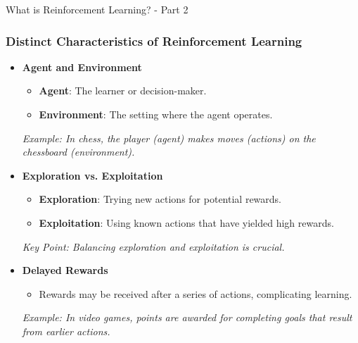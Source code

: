 \documentclass[aspectratio=169]{beamer}
\begin{document}
\begin{frame}[fragile]{What is Reinforcement Learning? - Part 2}
    \frametitle{Distinct Characteristics of Reinforcement Learning}
    \begin{itemize}
        \item \textbf{Agent and Environment}
            \begin{itemize}
                \item \textbf{Agent}: The learner or decision-maker.
                \item \textbf{Environment}: The setting where the agent operates.
            \end{itemize}
            \textit{Example: In chess, the player (agent) makes moves (actions) on the chessboard (environment).}
            
        \item \textbf{Exploration vs. Exploitation}
            \begin{itemize}
                \item \textbf{Exploration}: Trying new actions for potential rewards.
                \item \textbf{Exploitation}: Using known actions that have yielded high rewards.
            \end{itemize}
            \textit{Key Point: Balancing exploration and exploitation is crucial.}
            
        \item \textbf{Delayed Rewards}
            \begin{itemize}
                \item Rewards may be received after a series of actions, complicating learning.
            \end{itemize}
            \textit{Example: In video games, points are awarded for completing goals that result from earlier actions.}
    \end{itemize}
\end{frame}
\end{document}
